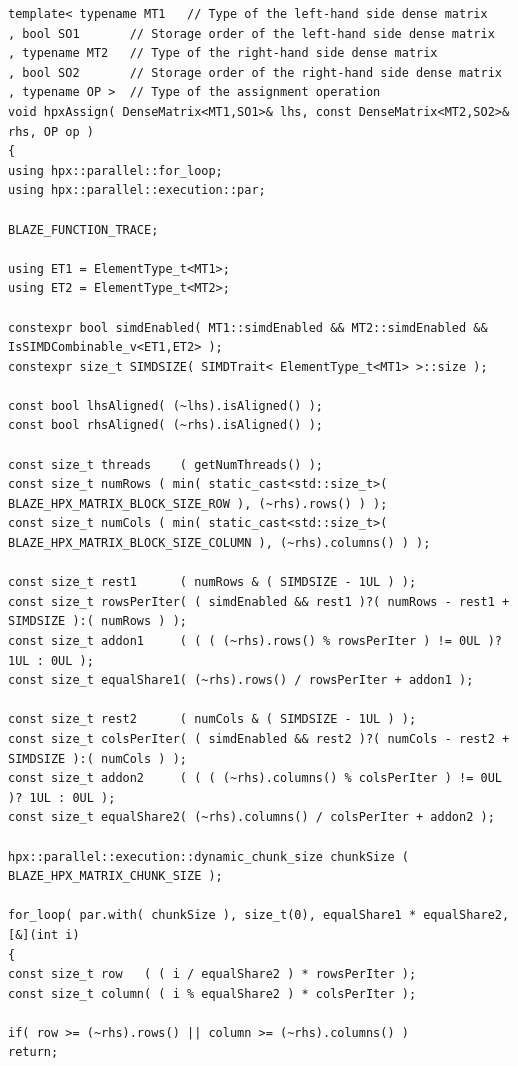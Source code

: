 \begin{lstlisting}[float,floatplacement=H,caption= {New implementation of Assign function for HPX backend in Blaze.}, label={newd_hpx_backend}]
template< typename MT1   // Type of the left-hand side dense matrix
, bool SO1       // Storage order of the left-hand side dense matrix
, typename MT2   // Type of the right-hand side dense matrix
, bool SO2       // Storage order of the right-hand side dense matrix
, typename OP >  // Type of the assignment operation
void hpxAssign( DenseMatrix<MT1,SO1>& lhs, const DenseMatrix<MT2,SO2>& rhs, OP op )
{
using hpx::parallel::for_loop;
using hpx::parallel::execution::par;

BLAZE_FUNCTION_TRACE;

using ET1 = ElementType_t<MT1>;
using ET2 = ElementType_t<MT2>;

constexpr bool simdEnabled( MT1::simdEnabled && MT2::simdEnabled && IsSIMDCombinable_v<ET1,ET2> );
constexpr size_t SIMDSIZE( SIMDTrait< ElementType_t<MT1> >::size );

const bool lhsAligned( (~lhs).isAligned() );
const bool rhsAligned( (~rhs).isAligned() );

const size_t threads    ( getNumThreads() );
const size_t numRows ( min( static_cast<std::size_t>( BLAZE_HPX_MATRIX_BLOCK_SIZE_ROW ), (~rhs).rows() ) );
const size_t numCols ( min( static_cast<std::size_t>( BLAZE_HPX_MATRIX_BLOCK_SIZE_COLUMN ), (~rhs).columns() ) );

const size_t rest1      ( numRows & ( SIMDSIZE - 1UL ) );
const size_t rowsPerIter( ( simdEnabled && rest1 )?( numRows - rest1 + SIMDSIZE ):( numRows ) );
const size_t addon1     ( ( ( (~rhs).rows() % rowsPerIter ) != 0UL )? 1UL : 0UL );
const size_t equalShare1( (~rhs).rows() / rowsPerIter + addon1 );

const size_t rest2      ( numCols & ( SIMDSIZE - 1UL ) );
const size_t colsPerIter( ( simdEnabled && rest2 )?( numCols - rest2 + SIMDSIZE ):( numCols ) );
const size_t addon2     ( ( ( (~rhs).columns() % colsPerIter ) != 0UL )? 1UL : 0UL );
const size_t equalShare2( (~rhs).columns() / colsPerIter + addon2 );

hpx::parallel::execution::dynamic_chunk_size chunkSize ( BLAZE_HPX_MATRIX_CHUNK_SIZE );

for_loop( par.with( chunkSize ), size_t(0), equalShare1 * equalShare2, [&](int i)
{
const size_t row   ( ( i / equalShare2 ) * rowsPerIter );
const size_t column( ( i % equalShare2 ) * colsPerIter );

if( row >= (~rhs).rows() || column >= (~rhs).columns() )
return;


\end{lstlisting}
